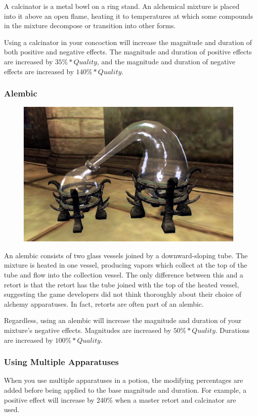 \documentclass[12pt]{book}
\begin{document}
A calcinator is a metal bowl on a ring stand. An alchemical mixture is placed into it above an open flame, heating it to temperatures at which some compounds in the mixture decompose or transition into other forms.

Using a calcinator in your concoction will increase the magnitude and duration of both positive and negative effects. The magnitude and duration of positive effects are increased by $35\%*Quality$, and the magnitude and duration of negative effects are increased by $140\%*Quality$.

\subsubsection{Alembic}

\begin{figure}
	\includegraphics[width=\textwidth]{alembic.png}
\end{figure}

An alembic consists of two glass vessels joined by a downward-sloping tube. The mixture is heated in one vessel, producing vapors which collect at the top of the tube and flow into the collection vessel. The only difference between this and a retort is that the retort has the tube joined with the top of the heated vessel, suggesting the game developers did not think thoroughly about their choice of alchemy apparatuses. In fact, retorts are often part of an alembic.

Regardless, using an alembic will increase the magnitude and duration of your mixture's negative effects. Magnitudes are increased by $50\%*Quality$. Durations are increased by $100\%*Quality$.

\subsubsection{Using Multiple Apparatuses}
When you use multiple apparatuses in a potion, the modifying percentages are added before being applied to the base magnitude and duration. For example, a positive effect will increase by 240\% when a master retort and calcinator are used.
\end{document}
